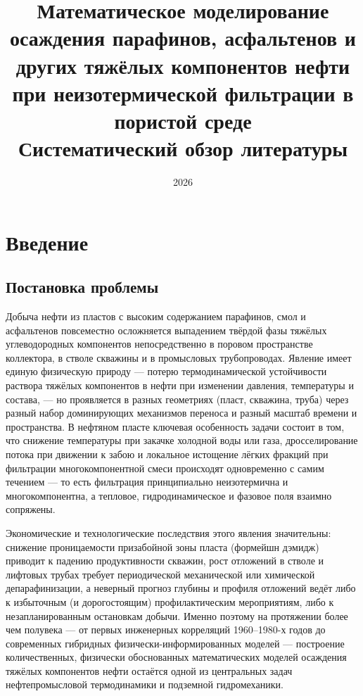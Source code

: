 \documentclass[11pt]{extarticle}
\title{Математическое моделирование осаждения парафинов, асфальтенов и других тяжёлых компонентов нефти при неизотермической фильтрации в пористой среде\\[0.5em]\large Систематический обзор литературы}
\author{}
\date{2026}
\begin{document}
\maketitle
\tableofcontents
\newpage

\section{Введение}\label{ux432ux432ux435ux434ux435ux43dux438ux435}

\subsection{Постановка проблемы}\label{ux43fux43eux441ux442ux430ux43dux43eux432ux43aux430-ux43fux440ux43eux431ux43bux435ux43cux44b}

Добыча нефти из пластов с высоким содержанием парафинов, смол и асфальтенов повсеместно осложняется выпадением твёрдой фазы тяжёлых углеводородных компонентов непосредственно в поровом пространстве коллектора, в стволе скважины и в промысловых трубопроводах. Явление имеет единую физическую природу --- потерю термодинамической устойчивости раствора тяжёлых компонентов в нефти при изменении давления, температуры и состава, --- но проявляется в разных геометриях (пласт, скважина, труба) через разный набор доминирующих механизмов переноса и разный масштаб времени и пространства. В нефтяном пласте ключевая особенность задачи состоит в том, что снижение температуры при закачке холодной воды или газа, дросселирование потока при движении к забою и локальное истощение лёгких фракций при фильтрации многокомпонентной смеси происходят одновременно с самим течением --- то есть фильтрация принципиально неизотермична и многокомпонентна, а тепловое, гидродинамическое и фазовое поля взаимно сопряжены.

Экономические и технологические последствия этого явления значительны: снижение проницаемости призабойной зоны пласта (формейшн дэмидж) приводит к падению продуктивности скважин, рост отложений в стволе и лифтовых трубах требует периодической механической или химической депарафинизации, а неверный прогноз глубины и профиля отложений ведёт либо к избыточным (и дорогостоящим) профилактическим мероприятиям, либо к незапланированным остановкам добычи. Именно поэтому на протяжении более чем полувека --- от первых инженерных корреляций 1960--1980-х годов до современных гибридных физически-информированных моделей --- построение количественных, физически обоснованных математических моделей осаждения тяжёлых компонентов нефти остаётся одной из центральных задач нефтепромысловой термодинамики и подземной гидромеханики.
\end{document}
